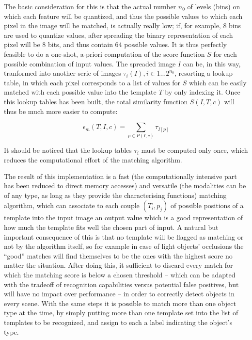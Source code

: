 The basic consideration for this is that the actual number $n_0$ of levels (bins)
on which each feature will be quantized, and thus the possible values
to which each pixel in the image will be matched, is actually really low; if,
for example, 8 bins are used to quantize values, after spreading the
binary representation of each pixel will be 8 bits, and thus contain
64 possible values. It is thus perfectly feasible to do a one-shot,
a-priori computation of the score function $S$ for each possible
combination of input values. The spreaded image $I$ can be, in this way,
tranformed into another serie of images $\tau_i(I), i \in 1 \dots 2^{n_0}$, resorting a lookup table, in
which each pixel corresponds to a list of values for $S$ which can be
easily matched with each possible value into the template $T$ by only
indexing it. Once this lookup tables has been built, the total
similarity function $S(I,T,c)$ will thus be much more easier to compute:

\begin{equation}
  \epsilon_m (T,I,c)=\sum_{p\in P(I,c)} { \tau_{I[p]} }
\end{equation}

It should be noticed that the lookup tables $\tau_i$ must be computed
only once, which reduces the computational effort of the matching
algorithm.

The result of this implementation is a fast (the computationally
intensive part has been reduced to direct memory accesses) and
versatile (the modalities can be of any type, as long as they provide
the characterising functions) matching algorithm, which can associate
to each couple $(T_i,p_j)$ of possible positions of a template into
the input image an output value which is a good representation of how
much the template fits well the chosen part of input. A natural but
important consequence of this is that no template will be flagged as
matching or not by the algorithm itself, so for example in case of light objects'
occlusions the ``good'' matches will find themselves to be the
ones with the highest score no matter the situation. After doing
this, it sufficient to discard every match for which the matching
score is below a chosen threshold -- which can be adapted with the
tradeoff of recognition capabilities versus potential false positives,
but will have no impact over performance -- in order to correctly
detect objects in every scene. With the same steps it is possible to
match more than one object type at the time, by simply putting more
than one template set into the list of templates to be recognized, and
assign to each a label indicating the object's type.

